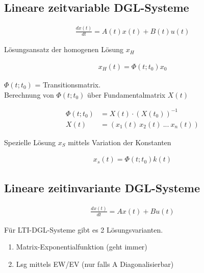\documentclass[10pt,a4paper]{article}
\begin{document}
\subsection{Lineare zeitvariable DGL-Systeme}
  \begin{mdframed}[style=exercise]
    \begin{align}
        \frac{dx(t)}{dt} = A(t)x(t) + B(t)u(t)
    \end{align}
  \end{mdframed}
Lösungsansatz der homogenen Lösung $x_H$
  \begin{mdframed}[style=exercise]
    \begin{align}
        x_H(t) = \Phi(t;t_0)x_0
    \end{align}
  \end{mdframed}
$\Phi(t;t_0)$ = Transitionsmatrix.\\
Berechnung von $\Phi(t;t_0)$ über Fundamentalmatrix $X(t)$
  \begin{mdframed}[style=exercise]
    \begin{align}
        \Phi(t;t_0) &= X(t) \cdot (X(t_0))^{-1} \\
        X(t) &= (x_1(t)\  x_2(t)\ ... \ x_n(t)) 
    \end{align}
  \end{mdframed}
Spezielle Lösung $x_S$ mittels Variation der Konstanten

  \begin{mdframed}[style=exercise]
    \begin{align}
        x_s(t) = \Phi(t;t_0)k(t)
    \end{align}
  \end{mdframed}

\subsection{Lineare zeitinvariante DGL-Systeme}
  \begin{mdframed}[style=exercise]
    \begin{align}
        \frac{dx(t)}{dt} = Ax(t) + Bu(t)
    \end{align}
  \end{mdframed}
Für LTI-DGL-Systeme gibt es 2 Lösungsvarianten.
\begin{enumerate}
    \item Matrix-Exponentialfunktion (geht immer)
    \item Lsg mittels EW/EV (nur falls A Diagonalisierbar)
\end{enumerate}
\end{document}
